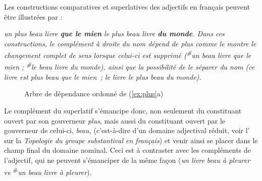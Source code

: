 {
\begin{sloppypar}
Les constructions comparatives et superlatives des adjectifs en français peuvent être illustrées par :
\end{sloppypar}

\ea\label{ex:plus}
\ea \itshape un plus beau livre \textbf{que le mien}
\ex \itshape le plus beau livre \textbf{du monde}.
\z
\z
Dans ces constructions, le complément à droite du nom dépend de \textit{plus} comme le montre le changement complet de sens lorsque celui-ci est supprimé (\textsuperscript{\#}\textit{un beau livre que le mien} ; \textsuperscript{\#}\textit{le beau livre du monde}), ainsi que la possibilité de le séparer du nom (\textit{ce livre est plus beau que le mien~}; \textit{le livre le plus beau du monde}).

\begin{figure}[H]
\caption{\label{fig:plus}Arbre de dépendance ordonné de (\ref{ex:plus}a)}
\end{figure}

Le complément du superlatif s’émancipe donc, non seulement du constituant ouvert par son gouverneur \textit{plus}, mais aussi du constituant ouvert par le gouverneur de celui-ci, \textit{beau,} (c’est-à-dire d’un domaine adjectival réduit, voir l’ sur la \textit{Topologie du groupe substantival en français}) et venir ainsi se placer dans le champ final du domaine nominal. Ceci est à contraster avec les compléments de l’adjectif, qui ne peuvent s’émanciper de la même façon (\textit{un livre beau à pleurer} vs \textsuperscript{\#}\textit{un beau livre à pleurer}).

}
